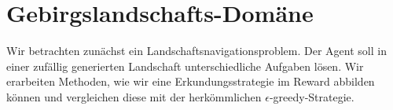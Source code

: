 \chapter{Gebirgslandschafts-Domäne}\label{sec:NavigationProblem}
Wir betrachten zunächst ein Landschaftsnavigationsproblem. Der Agent soll in einer zufällig generierten Landschaft unterschiedliche Aufgaben lösen. Wir erarbeiten Methoden, wie wir eine Erkundungsstrategie im Reward abbilden können und vergleichen diese mit der herkömmlichen $ \epsilon $-greedy-Strategie.





